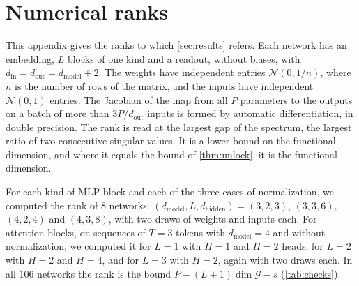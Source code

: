 \documentclass[10pt]{article}
\theoremstyle{definition}
\theoremstyle{remark}
\newcommand{\dm}{d_{\mathrm{model}}}
\newcommand{\dhid}{d_{\mathrm{hidden}}}
\newcommand{\G}{\mathcal{G}}
\begin{document}
\section{Numerical ranks}\label{app:checks}

This appendix gives the ranks to which \cref{sec:results} refers. Each network has an embedding, $L$ blocks of one kind and a readout, without biases, with $d_{\mathrm{in}} = d_{\mathrm{out}} = \dm + 2$. The weights have independent entries $\mathcal N(0, 1/n)$, where $n$ is the number of rows of the matrix, and the inputs have independent $\mathcal N(0, 1)$ entries. The Jacobian of the map from all $P$ parameters to the outputs on a batch of more than $3P/d_{\mathrm{out}}$ inputs is formed by automatic differentiation, in double precision. The rank is read at the largest gap of the spectrum, the largest ratio of two consecutive singular values. It is a lower bound on the functional dimension, and where it equals the bound of \cref{thm:unlock}, it is the functional dimension.

For each kind of MLP block and each of the three cases of normalization, we computed the rank of $8$ networks: $(\dm, L, \dhid) = (3, 2, 3)$, $(3, 3, 6)$, $(4, 2, 4)$ and $(4, 3, 8)$, with two draws of weights and inputs each. For attention blocks, on sequences of $T = 3$ tokens with $\dm = 4$ and without normalization, we computed it for $L = 1$ with $H = 1$ and $H = 2$ heads, for $L = 2$ with $H = 2$ and $H = 4$, and for $L = 3$ with $H = 2$, again with two draws each. In all $106$ networks the rank is the bound $P - (L+1)\dim\G - s$ (\cref{tab:checks}).
\end{document}
